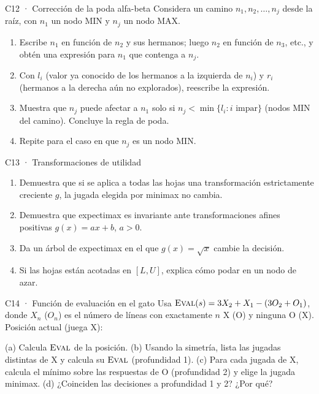 \begin{ejercicio}{C12 · Corrección de la poda alfa-beta }
Considera un camino $n_1,n_2,\dots,n_j$ desde la raíz, con $n_1$ un nodo MIN y $n_j$ un nodo MAX.
\begin{enumerate}[label=(\alph*)]
\item Escribe $n_1$ en función de $n_2$ y sus hermanos; luego $n_2$ en función de $n_3$, etc., y
obtén una expresión para $n_1$ que contenga a $n_j$.
\item Con $l_i$ (valor ya conocido de los hermanos a la izquierda de $n_i$) y $r_i$ (hermanos
a la derecha aún no explorados), reescribe la expresión.
\item Muestra que $n_j$ puede afectar a $n_1$ solo si $n_j<\min\{l_i : i \text{ impar}\}$ (nodos MIN
del camino). Concluye la regla de poda.
\item Repite para el caso en que $n_j$ es un nodo MIN.
\end{enumerate}
\end{ejercicio}

\begin{ejercicio}{C13 · Transformaciones de utilidad }
\begin{enumerate}[label=(\alph*)]
\item Demuestra que si se aplica a todas las hojas una transformación estrictamente creciente $g$, la
jugada elegida por minimax no cambia.
\item Demuestra que expectimax es invariante ante transformaciones afines positivas $g(x)=ax+b$, $a>0$.
\item Da un árbol de expectimax en el que $g(x)=\sqrt{x}$ cambie la decisión.
\item Si las hojas están acotadas en $[L,U]$, explica cómo podar en un nodo de azar.
\end{enumerate}
\end{ejercicio}

\begin{ejercicio}{C14 · Función de evaluación en el gato }
Usa $\textsc{Eval}(s)=3X_2+X_1-(3O_2+O_1)$, donde $X_n$ ($O_n$) es el número de líneas con exactamente
$n$ X (O) y ninguna O (X). Posición actual (juega X):
\begin{center}\end{center}
(a) Calcula $\textsc{Eval}$ de la posición. (b) Usando la simetría, lista las jugadas distintas de X y
calcula su $\textsc{Eval}$ (profundidad 1). (c) Para cada jugada de X, calcula el mínimo sobre las respuestas
de O (profundidad 2) y elige la jugada minimax. (d) ¿Coinciden las decisiones a profundidad 1 y 2? ¿Por qué?
\end{ejercicio}

